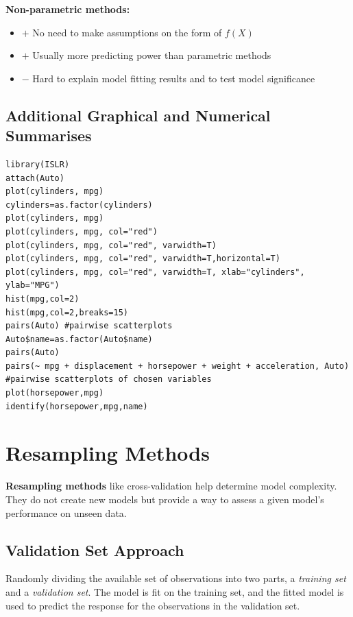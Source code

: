 \documentclass[11pt]{article}
\begin{document}
\noindent \textbf{Non-parametric methods:}
\begin{itemize}
    \item $+$ No need to make assumptions on the form of $f(X)$
    \item $+$ Usually more predicting power than parametric methods
    \item $-$ Hard to explain model fitting results and to test model significance
\end{itemize}

\subsection{Additional Graphical and Numerical Summarises}
\begin{lstlisting}
library(ISLR)
attach(Auto)
plot(cylinders, mpg)
cylinders=as.factor(cylinders)
plot(cylinders, mpg)
plot(cylinders, mpg, col="red")
plot(cylinders, mpg, col="red", varwidth=T)
plot(cylinders, mpg, col="red", varwidth=T,horizontal=T)
plot(cylinders, mpg, col="red", varwidth=T, xlab="cylinders", ylab="MPG")
hist(mpg,col=2)
hist(mpg,col=2,breaks=15)
pairs(Auto) #pairwise scatterplots
Auto$name=as.factor(Auto$name)
pairs(Auto)
pairs(~ mpg + displacement + horsepower + weight + acceleration, Auto)
#pairwise scatterplots of chosen variables
plot(horsepower,mpg)
identify(horsepower,mpg,name)
\end{lstlisting}

\newpage

\section{Resampling Methods}

\noindent \textbf{Resampling methods} like cross-validation help determine model complexity. They do not create new models but provide a way to assess a given model’s performance on unseen data. \\

\subsection{Validation Set Approach}
\noindent Randomly dividing the available set of observations into two parts, a \textit{training set} and a \textit{validation set}. The model is fit on the training set, and the fitted model is used to predict the response for the observations in the validation set. \\
\end{document}
